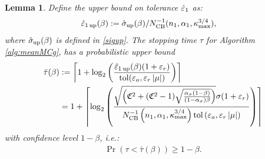 \documentclass{iitthesis}
\newtheorem{lemma}[theorem]{Lemma}
\theoremstyle{definition}
\begin{document}
\begin{lemma}\label{tauprobbound}
Define the upper bound on tolerance $\hat{\varepsilon}_1$ as:
\begin{align}\label{eps1updef}
\hat{\varepsilon}_{1\operatorname{up}}(\beta)&:=\hat{\sigma}_{\operatorname{up}}(\beta)/N_{\text{CB}}^{-1}(n_1,\alpha_1,\kappa_{\max}^{3/4}),
\end{align}
where $\hat{\sigma}_{\operatorname{up}}(\beta)$ is defined in \eqref{sigup}. The stopping time $\tau$ for Algorithm \ref{alg:meanMCg}, has a probabilistic upper bound
\begin{align}
\bar{\tau}(\beta)&:= \left \lceil 1+\log_2 \left(\frac{\hat{\varepsilon}_{1\operatorname{up}}(\beta)(1+\varepsilon_r)}{ \operatorname{tol}(\varepsilon_a,\varepsilon_r \left \lvert \mu \right \rvert)}\right) \right \rceil \label{taubardef} \\
&=1+\left \lceil \log_2 \left(\frac{\sqrt{\left(\mathfrak{C}^2+(\mathfrak{C}^2-1)\sqrt{\frac{\alpha_{\sigma}(1-\beta)}{(1-\alpha_{\sigma})\beta}}\right)}\sigma(1+\varepsilon_r)}{ N_{\text{CB}}^{-1}\left(n_1,\alpha_1,\kappa_{\max}^{3/4}\right)\operatorname{tol}\left(\varepsilon_a,\varepsilon_r \left \lvert \mu \right \rvert\right)}\right)\right \rceil \label{taubarexplicitdef}
\end{align}
with confidence level $1-\beta$, i.e.:
\begin{align}\label{ineq:taufinite}
\Pr(\tau <\bar{\tau}(\beta)) \geq 1-\beta.
\end{align}
\end{lemma}
\end{document}
